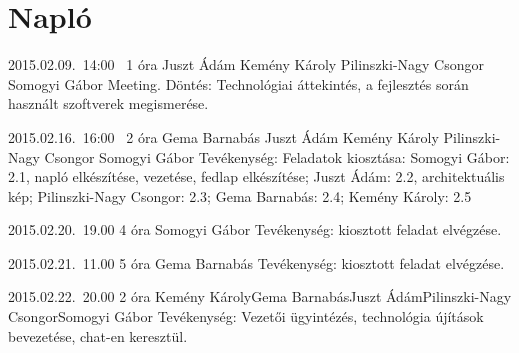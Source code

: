 %
\section{Napló}

\begin{naplo}

\bejegyzes
{2015.02.09.~14:00~} %
{1 óra} %
{Juszt Ádám\newline
Kemény Károly\newline
Pilinszki-Nagy Csongor\newline
Somogyi Gábor} %
{Meeting. Döntés: Technológiai áttekintés, a fejlesztés során használt szoftverek megismerése.} %

\bejegyzes
{2015.02.16.~16:00~}
{2 óra}
{Gema Barnabás\newline
	Juszt Ádám\newline
	Kemény Károly\newline
	Pilinszki-Nagy Csongor\newline
	Somogyi Gábor} %
{Tevékenység: Feladatok kiosztása: Somogyi Gábor: 2.1, napló elkészítése, vezetése, fedlap elkészítése; Juszt Ádám: 2.2, architektuális kép; Pilinszki-Nagy Csongor: 2.3; Gema Barnabás: 2.4; Kemény Károly: 2.5}

\bejegyzes
{2015.02.20.~19.00}
{4 óra}
{Somogyi Gábor}
{Tevékenység: kiosztott feladat elvégzése.}

\bejegyzes
{2015.02.21.~11.00}
{5 óra}
{Gema Barnabás}
{Tevékenység: kiosztott feladat elvégzése.}

\bejegyzes
{2015.02.22.~20.00}
{2 óra}
{Kemény Károly\newline Gema Barnabás\newline Juszt Ádám\newline Pilinszki-Nagy Csongor\newline Somogyi Gábor}
{Tevékenység: Vezetői ügyintézés, technológia újítások bevezetése, chat-en keresztül.}


\end{naplo}


